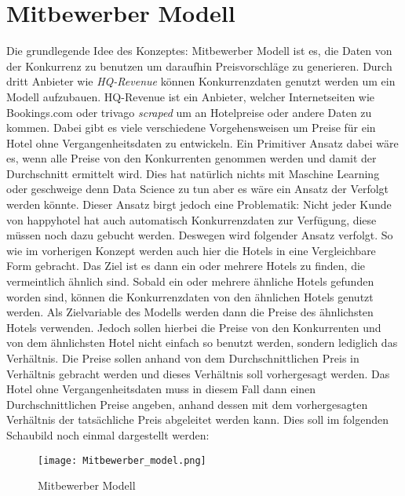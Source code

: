 \section{Mitbewerber Modell}
\label{sec:Mitbewerber}
Die grundlegende Idee des Konzeptes: Mitbewerber Modell ist es, die Daten von der Konkurrenz zu benutzen um daraufhin Preisvorschläge zu generieren. 
\newline
\newline
Durch dritt Anbieter wie \emph{HQ-Revenue} können Konkurrenzdaten genutzt werden um ein Modell aufzubauen. HQ-Revenue ist ein Anbieter, welcher Internetseiten wie Bookings.com oder trivago \emph{scraped} um an Hotelpreise oder andere Daten zu kommen. Dabei gibt es viele verschiedene Vorgehensweisen um Preise für ein Hotel ohne Vergangenheitsdaten zu entwickeln. Ein Primitiver Ansatz dabei wäre es, wenn alle Preise von den Konkurrenten genommen werden und damit der Durchschnitt ermittelt wird. Dies hat natürlich nichts mit Maschine Learning oder geschweige denn Data Science zu tun aber es wäre ein Ansatz der Verfolgt werden könnte. 
\newline
\newline
Dieser Ansatz birgt jedoch eine Problematik: Nicht jeder Kunde von happyhotel hat auch automatisch Konkurrenzdaten zur Verfügung, diese müssen noch dazu gebucht werden. Deswegen wird folgender Ansatz verfolgt. 
\newline
\newline
So wie im vorherigen Konzept \emph{} werden auch hier die Hotels in eine Vergleichbare Form gebracht. Das Ziel ist es dann ein oder mehrere Hotels zu finden, die vermeintlich ähnlich sind. Sobald ein oder mehrere ähnliche Hotels gefunden worden sind, können die Konkurrenzdaten von den ähnlichen Hotels genutzt werden. 
\newline
\newline
Als Zielvariable des Modells werden dann die Preise des ähnlichsten Hotels verwenden.  Jedoch sollen hierbei die Preise von den Konkurrenten und von dem ähnlichsten Hotel nicht einfach so benutzt werden, sondern lediglich das Verhältnis. Die Preise sollen anhand von dem Durchschnittlichen Preis in Verhältnis gebracht werden und dieses Verhältnis soll vorhergesagt werden. 
\newline
\newline 
Das Hotel ohne Vergangenheitsdaten muss in diesem Fall dann einen Durchschnittlichen Preise angeben, anhand dessen mit dem vorhergesagten  Verhältnis der tatsächliche Preis abgeleitet werden kann. Dies soll im folgenden Schaubild noch einmal dargestellt werden:
\begin{figure}[h]
    \centering
    \texttt{[image: Mitbewerber\_model.png]}
    \caption[Mitbewerber Modell]{Mitbewerber Modell}
    \label{img:all_hotels}
\end{figure}
